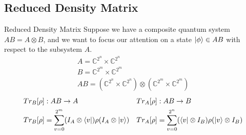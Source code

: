 \documentclass[11pt,svgnames,smaller,aspectratio=43,english]{beamer}
\newcommand{\tensor}{\otimes}
\begin{document}
\subsection{Reduced Density Matrix}
\begin{frame}{Reduced Density Matrix}
	Suppose we have a composite quantum system $AB = A \tensor B$, and we want to focus our attention on a state $\ket{\phi} \in AB$ with respect to the subsystem $A$.
	\begin{gather*}
		A = \mathbb{C}^{2^n}\times\mathbb{C}^{2^n}\\
		B = \mathbb{C}^{2^m}\times\mathbb{C}^{2^m}\\
		AB = (\mathbb{C}^{2^n}\times\mathbb{C}^{2^n})\tensor(\mathbb{C}^{2^m}\times\mathbb{C}^{2^m})
	\end{gather*}
	\begin{align*}
		Tr_B[\rho] &: AB \rightarrow A && Tr_A[\rho] : AB \rightarrow B\\
		Tr_B[\rho] &= \sum_{v=0}^{2^m} (I_A \tensor \bra{v})\rho(I_A \tensor \ket{v}) && Tr_A[\rho] = \sum_{v=0}^{2^n} (\bra{v} \tensor I_B)\rho(\ket{v} \tensor I_B)
	\end{align*}
\end{frame}
\end{document}
